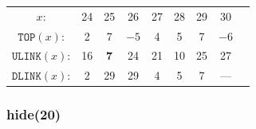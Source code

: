 \documentclass[a4paper,landscape,11pt]{article}
\begin{document}
\begin{table}[h!]
\begin{center}
\begin{tabular}{c c c c c c c c c }
			\hline
			$x$:                 & 24  & 25         & 26   & 27   & 28          & 29         & 30   &             \\
			$\texttt{TOP}(x)$:   & 2   & 7          & $-5$ & 4    & 5           & 7          & $-6$ &             \\
			$\texttt{ULINK}(x)$: & 16  & \textbf{7} & 24   & 21   & 10          & 25         & 27   &             \\
			$\texttt{DLINK}(x)$: & 2   & 29         & 29   & 4    & 5           & 7          & ---  &             \\
		\end{tabular}
	\end{center}
\end{table}

\subsubsection{hide(20)}
\end{document}
